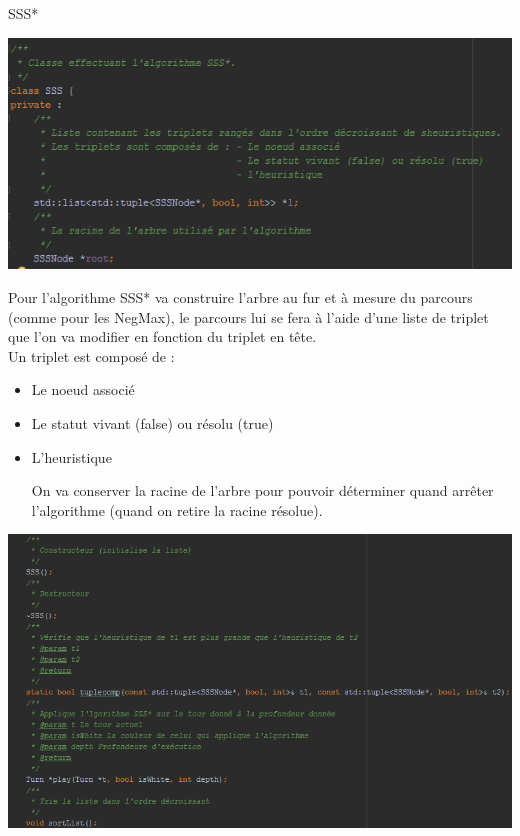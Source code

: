 \documentclass[a4paper]{article}
\makeatletter
\renewcommand{\section}{\@startsection{section}{1}{\z@}
{-4ex \@plus -1ex \@minus -.4ex}
{1ex \@plus.2ex }
{\normalfont\large\sffamily\bfseries}}
\makeatother
\begin{document}
\section{SSS*}
\begin{center}
\includegraphics[scale=1]{ressources/SSS.png}
\end{center}

Pour l'algorithme SSS* va construire l'arbre au fur et à mesure du parcours (comme pour les NegMax), le parcours lui se fera à l'aide d'une liste de triplet que l'on va modifier en fonction du triplet en tête.\\
Un triplet est composé de : \begin{itemize}
\item Le noeud associé
\item Le statut vivant (false) ou résolu (true)
\item L'heuristique

On va conserver la racine de l'arbre pour pouvoir déterminer quand arrêter l'algorithme (quand on retire la racine résolue).

\end{itemize}

\begin{center}
\includegraphics[scale=.5]{ressources/SSSShow.png}
\end{center}
\end{document}
